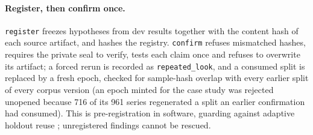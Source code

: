 \paragraph{Register, then confirm once.} \texttt{register} freezes hypotheses from dev results together with the
content hash of each source artifact, and hashes the registry. \texttt{confirm} refuses mismatched hashes,
requires the private seal to verify, tests each claim once and refuses to overwrite its artifact; a forced rerun
is recorded as \texttt{repeated\_look}, and a consumed split is replaced by a fresh epoch, checked for sample-hash overlap
with every earlier split of every corpus version (an epoch minted for the case study was rejected unopened because 716 of
its 961 series regenerated a split an earlier confirmation had consumed). This is
pre-registration \citep{nosek2018preregistration} in software, guarding against adaptive holdout reuse
\citep{dwork2015reusable}; unregistered findings cannot be rescued.

